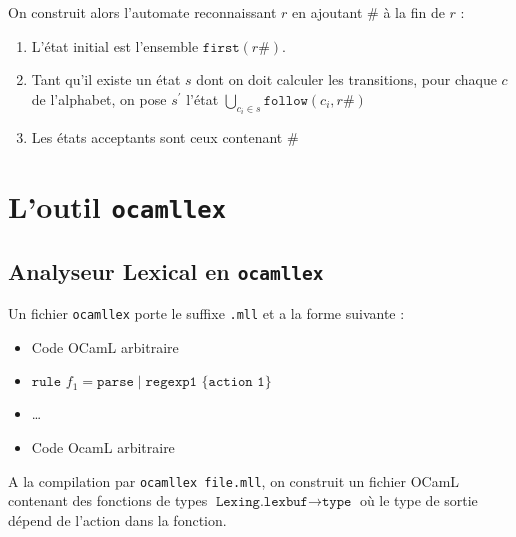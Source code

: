 \documentclass{cours}
\begin{document}
On construit alors l'automate reconnaissant $r$ en ajoutant $\#$ à la fin de $r$ :
\begin{enumerate}
    \item L'état initial est l'ensemble $\texttt{first}(r\#)$.
    \item Tant qu'il existe un état $s$ dont on doit calculer les transitions, pour chaque $c$ de l'alphabet, on pose $s^{'}$ l'état $\bigcup_{c_{i} \in s} \texttt{follow}(c_{i}, r\#)$
    \item Les états acceptants sont ceux contenant $\#$
\end{enumerate}

\section{L'outil \texttt{ocamllex}}
\subsection{Analyseur Lexical en \texttt{ocamllex}}
Un fichier \texttt{ocamllex} porte le suffixe \texttt{.mll} et a la forme suivante :
\begin{itemize}
    \item Code OCamL arbitraire
    \item $\texttt{rule } f_{1} = \texttt{parse} \mid \texttt{regexp1 } \{\texttt{action 1}\}$
    \item \dots
    \item Code OcamL arbitraire
\end{itemize}
A la compilation par \texttt{ocamllex file.mll}, on construit un fichier OCamL contenant des fonctions de types $\texttt{Lexing.lexbuf} \rightarrow \texttt{type}$ où le type de sortie dépend de l'action dans la fonction. \\
\end{document}
